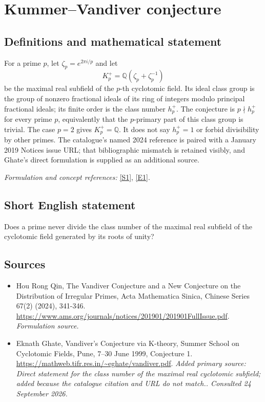 \documentclass[11pt]{article}
\begin{document}
\section*{\texorpdfstring{Kummer–Vandiver conjecture}{Kummer–Vandiver conjecture}}\label{9400055}
\subsection{Definitions and mathematical statement}
For a prime $p$, let $\zeta_p=e^{2\pi i/p}$ and let
\[
 K_p^+={\mathbb{Q}}(\zeta_p+\zeta_p^{-1})
\]
be the maximal real subfield of the $p$-th cyclotomic field. Its ideal class group is the group of nonzero fractional ideals of its ring of integers modulo principal fractional ideals; its finite order is the class number $h_p^+$. The conjecture is $p\nmid h_p^+$ for every prime $p$, equivalently that the $p$-primary part of this class group is trivial. The case $p=2$ gives $K_p^+={\mathbb{Q}}$. It does not say $h_p^+=1$ or forbid divisibility by other primes. The catalogue's named 2024 reference is paired with a January 2019 Notices issue URL; that bibliographic mismatch is retained visibly, and Ghate's direct formulation is supplied as an additional source.
\par\smallskip\textit{Formulation and concept references:} \href{https://www.ams.org/journals/notices/201901/201901FullIssue.pdf}{[S1]}, \href{https://mathweb.tifr.res.in/~eghate/vandiver.pdf}{[E1]}.

\subsection{Short English statement}
Does a prime never divide the class number of the maximal real subfield of the cyclotomic field generated by its roots of unity?
\subsection{Sources}
\begin{itemize}
\item[S1]Hou Rong Qin, The Vandiver Conjecture and a New Conjecture on the Distribution of Irregular Primes, Acta Mathematica Sinica, Chinese Series 67(2) (2024), 341-346.
\url{https://www.ams.org/journals/notices/201901/201901FullIssue.pdf}.
\textit{Formulation source.}
\item[E1]Eknath Ghate, Vandiver’s Conjecture via K-theory, Summer School on Cyclotomic Fields, Pune, 7–30 June 1999, Conjecture 1.
\url{https://mathweb.tifr.res.in/~eghate/vandiver.pdf}.
\textit{Added primary source: Direct statement for the class number of the maximal real cyclotomic subfield; added because the catalogue citation and URL do not match.. Consulted 24 September 2026.}
\end{itemize}
\end{document}
